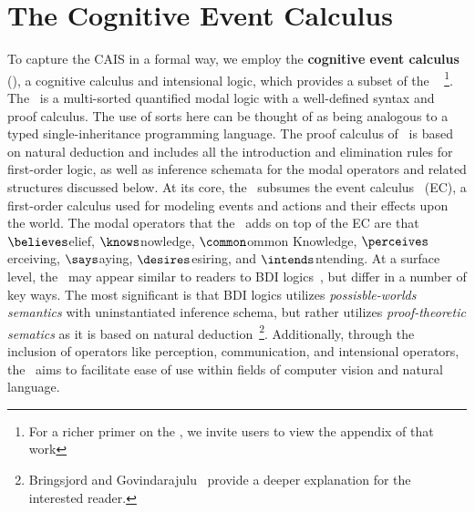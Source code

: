\section{The Cognitive Event Calculus}


To capture the CAIS in a formal way, we employ the
\textbf{cognitive event calculus} (\CEC), a cognitive calculus and
intensional logic, which provides a subset of the \DCEC~\cite{nsg_sb_dde_ijcai}
\footnote{For a richer primer on the \DCEC, we invite users to view the
appendix of that work}. The \CEC\ is a multi-sorted quantified modal logic with a 
well-defined syntax and proof calculus. The use of sorts here can be thought of
as being analogous to a typed single-inheritance programming language. The
proof calculus of \CEC\ is based on natural deduction 
\cite{gentzen_investigations_1964} and includes all the introduction and
elimination rules for first-order logic, as well as inference schemata for
the modal operators and related structures discussed below. At its core, the
\CEC\ subsumes the event calculus~\cite{mueller_commonsense_2014} (EC), a
first-order calculus used for
modeling events and actions and their effects upon the world. The modal
operators that the \CEC\ adds on top of the EC are that
$\believes$elief, $\knows$nowledge, $\common$ommon Knowledge, $\perceives$erceiving,
$\says$aying, $\desires$esiring, and $\intends$ntending. At a surface level,
the \CEC\ may appear similar to readers to BDI logics~\cite{rao_modeling_1991},
but  differ in a number of key ways. The most significant is that BDI logics
utilizes \textit{possisble-worlds semantics} with uninstantiated inference
schema, but rather utilizes \textit{proof-theoretic sematics} as it is based
on natural deduction~\cite{gentzen_untersuchungen_1935}\footnote{Bringsjord and
Govindarajulu~\cite{bringsjord_given_2012} provide a deeper explanation for
the interested reader.}. Additionally, through the inclusion of operators
like perception, communication, and intensional operators, the \CEC\ aims
to facilitate ease of use within fields of computer vision and natural language.

